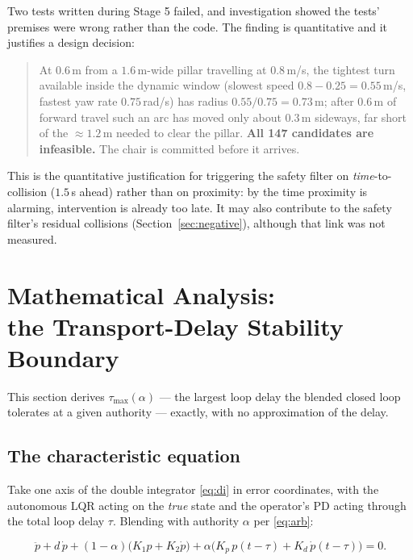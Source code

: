 \documentclass[11pt,a4paper]{article}
\theoremstyle{plain}
\theoremstyle{definition}
\begin{document}
Two tests written during Stage 5 failed, and investigation showed the
tests' premises were wrong rather than the code. The finding is
quantitative and it justifies a design decision:

\begin{quote}
At $0.6$\,m from a $1.6$\,m-wide pillar travelling at $0.8$\,m/s, the
tightest turn available inside the dynamic window (slowest speed
$0.8 - 0.25 = 0.55$\,m/s, fastest yaw rate $0.75$\,rad/s) has radius
$0.55/0.75 = 0.73$\,m; after $0.6$\,m of forward travel such an arc has
moved only about $0.3$\,m sideways, far short of the $\approx 1.2$\,m
needed to clear the pillar.
\textbf{All 147 candidates are infeasible.} The chair is committed
before it arrives.
\end{quote}

This is the quantitative justification for triggering the safety filter
on \emph{time}-to-collision ($1.5$\,s ahead) rather than on proximity: by
the time proximity is alarming, intervention is already too late. It
may also contribute to the safety filter's residual collisions
(Section~\ref{sec:negative}), although that link was not measured.

\section[Mathematical Analysis: the Transport-Delay Stability Boundary]{Mathematical Analysis:\\ the Transport-Delay Stability Boundary}
\label{sec:math}

This section derives $\tau_{\max}(\alpha)$ --- the largest loop delay
the blended closed loop tolerates at a given authority --- exactly, with
no approximation of the delay.

\subsection{The characteristic equation}

Take one axis of the double integrator \eqref{eq:di} in error
coordinates, with the autonomous LQR acting on the \emph{true} state and
the operator's PD acting through the total loop delay $\tau$. Blending
with authority $\alpha$ per \eqref{eq:arb}:

\begin{equation}
\ddot p + d\,\dot p
+ (1-\alpha)\bigl(K_1 p + K_2 \dot p\bigr)
+ \alpha\bigl(K_p\, p(t-\tau) + K_d\, \dot p(t-\tau)\bigr) = 0 .
\label{eq:dde}
\end{equation}
\end{document}
